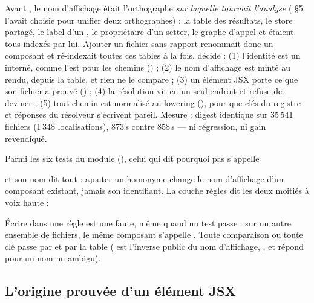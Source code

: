 \begin{decision}
Avant , le nom d'affichage était l'orthographe \emph{sur laquelle tournait l'analyse}
( §5 l'avait choisie pour unifier deux orthographes) : la table des résultats, le store
partagé, le label d'un , le propriétaire d'un setter, le graphe d'appel et
 étaient tous indexés par lui. Ajouter un fichier sans rapport renommait donc un
composant et ré-indexait toutes ces tables à la fois.  décide : (1) l'identité est un
 interné, comme  l'est pour les chemins () ; (2) le nom
d'affichage est minté au rendu, depuis la table, et rien ne le compare ; (3) un élément JSX
porte ce que son fichier a prouvé () ; (4) la résolution vit en un seul
endroit et refuse de deviner ; (5) tout chemin est normalisé au lowering
(), pour que clés du registre et réponses du résolveur s'écrivent
pareil. Mesure : digest identique sur 35\,541 fichiers (1\,348 localisations), 873\,s contre
858\,s --- ni régression, ni gain revendiqué.
\end{decision}

Parmi les six tests du module (), celui qui \og dit
pourquoi pas\fg{} s'appelle
\begin{center}\end{center}
\noindent et son nom dit tout : ajouter un homonyme
change le nom d'affichage d'un composant existant, jamais son identifiant. La couche règles
dit les deux moitiés à voix haute :


\begin{piege}
Écrire  dans une règle est une faute, même quand un
test passe : sur un autre ensemble de fichiers, le même composant s'appelle
. Toute comparaison ou toute clé passe par  et par
la table ( est l'inverse public du nom
d'affichage, , et répond  pour un nom nu
ambigu).
\end{piege}

\subsection{L'origine prouvée d'un élément JSX}

